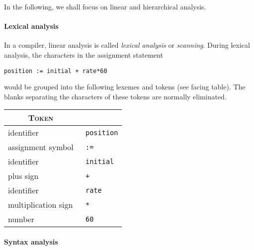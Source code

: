 In the following, we shall focus on linear and hierarchical analysis.

\paragraph{Lexical analysis}
\label{lexing_eg}

In a compiler, linear analysis is called \emph{lexical analysis} or
\emph{scanning}. During lexical analysis, the characters in the
assignment statement
\begin{verbatim}
position := initial + rate*60
\end{verbatim}
\noindent would be grouped into the following lexemes and tokens (see
facing table). The blanks separating the characters of these tokens
are normally eliminated.
\begin{center}
\begin{tabular}{l|>{\tt}l}
\toprule
  \multicolumn{1}{c}{\textsc{Token}}
& \multicolumn{1}{c}{\textsc{Lexeme}}\\
\midrule
identifier & position\\
assignment symbol & :=\\
identifier & initial\\
plus sign & +\\
identifier & rate\\
multiplication sign & *\\
number & 60\\
\bottomrule
\end{tabular}
\end{center}

\paragraph{Syntax analysis}

